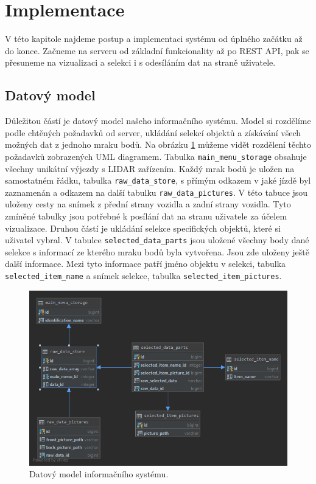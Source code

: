\documentclass[czech,bachelor,dept420,male,cpdeclaration]{diploma}
\begin{document}
\section{Implementace}
V této kapitole najdeme postup a implementaci systému od úplného začátku až do konce. Začneme na serveru od základní funkcionality až po REST API, pak se přesuneme na vizualizaci a selekci i s odesíláním dat na straně uživatele.

\subsection{Datový model}
Důležitou částí je datový model našeho informačního systému. Model si rozdělíme podle chtěných požadavků od server, ukládání selekcí objektů a získávání všech možných dat z jednoho mraku bodů. Na obrázku \ref{fig:datamodel} můžeme vidět rozdělení těchto požadavků zobrazených UML diagramem. Tabulka \texttt{main\_menu\_storage} obsahuje všechny unikátní výjezdy s LIDAR zařízením. Každý mrak bodů je uložen na samostatném řádku, tabulka \texttt{raw\_data\_store}, s přímým odkazem v jaké jízdě byl zaznamenán a odkazem na další tabulku \texttt{raw\_data\_pictures}. V této tabuce jsou uloženy cesty na snímek z přední strany vozidla a zadní strany vozidla. Tyto zmíněné tabulky jsou potřebné k posílání dat na stranu uživatele za účelem vizualizace. 
Druhou částí je ukládání selekce specifických objektů, které si uživatel vybral. V tabulce \texttt{selected\_data\_parts} jsou uložené všechny body dané selekce s informací ze kterého mraku bodů byla vytvořena. Jsou zde uloženy ještě další informace. Mezi tyto informace patří jméno objektu v selekci, tabulka \texttt{selected\_item\_name} a snímek selekce, tabulka \texttt{selected\_item\_pictures}. 

\begin{figure}[H]
\includegraphics[width=\linewidth]{Figures/dataModel.png}
\caption{Datový model informačního systému. }
\label{fig:datamodel}
\end{figure} 
\end{document}
